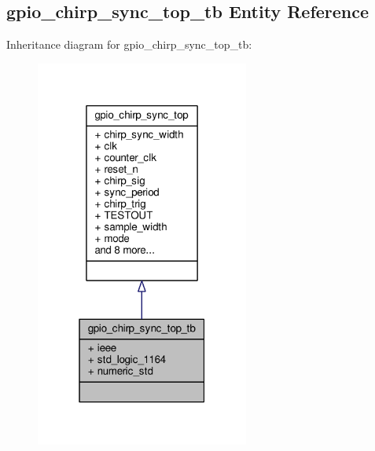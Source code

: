 \subsection{gpio\+\_\+chirp\+\_\+sync\+\_\+top\+\_\+tb Entity Reference}
\label{classgpio__chirp__sync__top__tb}


Inheritance diagram for gpio\+\_\+chirp\+\_\+sync\+\_\+top\+\_\+tb\+:\nopagebreak
\begin{figure}[H]
\begin{center}
\leavevmode
\includegraphics[width=199pt]{d5/d33/classgpio__chirp__sync__top__tb__inherit__graph}
\end{center}
\end{figure}


